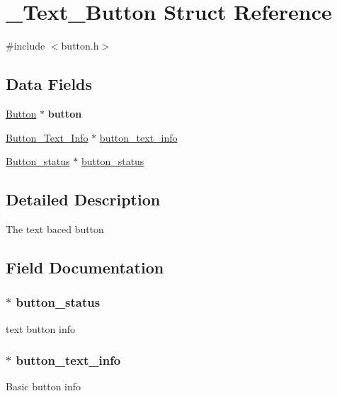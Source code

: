 \hypertarget{struct___text___button}{\section{\+\_\+\+Text\+\_\+\+Button Struct Reference}
\label{struct___text___button}
}


{\ttfamily \#include $<$button.\+h$>$}

\subsection*{Data Fields}
\begin{DoxyCompactItemize}
\item 
\hypertarget{struct___text___button_afcbb5b54142bac4e305b31cbebe41064}{\hyperlink{struct___button}{Button} $\ast$ {\bfseries button}}\label{struct___text___button_afcbb5b54142bac4e305b31cbebe41064}

\item 
\hyperlink{struct___button___text___info}{Button\+\_\+\+Text\+\_\+\+Info} $\ast$ \hyperlink{struct___text___button_ab64035e509bab4503a5e1798bcd3d94f}{button\+\_\+text\+\_\+info}
\item 
\hyperlink{struct__button__status}{Button\+\_\+status} $\ast$ \hyperlink{struct___text___button_af1ab6c7287e67a55a8e855e08302f8be}{button\+\_\+status}
\end{DoxyCompactItemize}


\subsection{Detailed Description}
The text baced button 

\subsection{Field Documentation}
\hypertarget{struct___text___button_af1ab6c7287e67a55a8e855e08302f8be}{
\subsubsection[{button\+\_\+status}]{$\ast$ button\+\_\+status}}\label{struct___text___button_af1ab6c7287e67a55a8e855e08302f8be}
text button info \hypertarget{struct___text___button_ab64035e509bab4503a5e1798bcd3d94f}{
\subsubsection[{button\+\_\+text\+\_\+info}]{$\ast$ button\+\_\+text\+\_\+info}}\label{struct___text___button_ab64035e509bab4503a5e1798bcd3d94f}
Basic button info 

